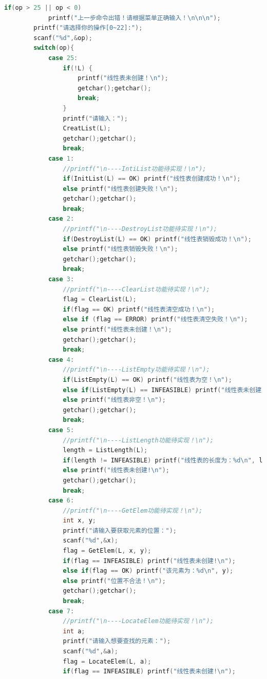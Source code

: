 \documentclass[supercite]{Experimental_Report}
\theoremstyle{definition}
\begin{document}
\begin{lstlisting}[language=c]
        if(op > 25 || op < 0)
            printf("上一步命令出错！请根据菜单正确输入！\n\n\n");
        printf("请选择你的操作[0~22]:");
        scanf("%d",&op);
        switch(op){
        	case 25:
				if(!L) {
					printf("线性表未创建！\n"); 
					getchar();getchar();
                	break;
				}
				printf("请输入："); 
				CreatList(L);
				getchar();getchar();
                break;
            case 1:
                //printf("\n----IntiList功能待实现！\n");
                if(InitList(L) == OK) printf("线性表创建成功！\n");
                else printf("线性表创建失败！\n");
                getchar();getchar();
                break;
            case 2:
                //printf("\n----DestroyList功能待实现！\n");
                if(DestroyList(L) == OK) printf("线性表销毁成功！\n");
                else printf("线性表销毁失败！\n");
                getchar();getchar();
                break;
            case 3:
                //printf("\n----ClearList功能待实现！\n");
                flag = ClearList(L); 
                if(flag == OK) printf("线性表清空成功！\n");
                else if (flag == ERROR) printf("线性表清空失败！\n");
                else printf("线性表未创建！\n");
                getchar();getchar();
                break;
            case 4:
                //printf("\n----ListEmpty功能待实现！\n");
                if(ListEmpty(L) == OK) printf("线性表为空！\n");
                else if(ListEmpty(L) == INFEASIBLE) printf("线性表未创建！\n");
				else printf("线性表非空！\n");
                getchar();getchar();
                break;
            case 5:
                //printf("\n----ListLength功能待实现！\n");
                length = ListLength(L);
                if(length != INFEASIBLE) printf("线性表的长度为：%d\n", length);
                else printf("线性表未创建!\n");
                getchar();getchar();
                break;
            case 6:
                //printf("\n----GetElem功能待实现！\n");
                int x, y;
                printf("请输入要获取元素的位置：");
                scanf("%d",&x);
                flag = GetElem(L, x, y);
                if(flag == INFEASIBLE) printf("线性表未创建!\n");
                else if(flag == OK) printf("该元素为：%d\n", y);
                else printf("位置不合法！\n");
                getchar();getchar();
                break;
            case 7:
                //printf("\n----LocateElem功能待实现！\n");
                int a;
                printf("请输入想要查找的元素：");
                scanf("%d",&a);
                flag = LocateElem(L, a);
                if(flag == INFEASIBLE) printf("线性表未创建!\n");

\end{lstlisting}
\end{document}
